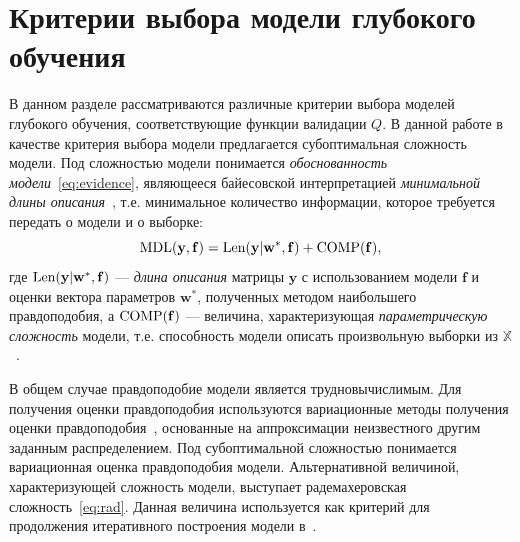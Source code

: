 \section{Критерии выбора модели глубокого обучения}
В данном разделе рассматриваются различные критерии выбора моделей глубокого обучения, соответствующие функции валидации $Q$.
В данной работе в качестве критерия выбора модели предлагается субоптимальная сложность модели. Под сложностью модели понимается \emph{обоснованность модели}~\eqref{eq:evidence}, являющееся байесовской интерпретацией \emph{минимальной длины описания}~\cite{mdl}, т.е. минимальное количество информации, которое требуется передать о модели и о выборке:
\begin{equation}
\label{eq:mdl}
	\textnormal{MDL}(\mathbf{y},\mathbf{f}) = \textnormal{Len}(\mathbf{y}|\mathbf{w}^{*}, \mathbf{f}) + \textnormal{COMP}(\mathbf{f}),
\end{equation}
где  $\textnormal{Len}(\mathbf{y}|\mathbf{w}^{*}, \mathbf{f})$ --- \emph{длина описания} матрицы $\mathbf{y}$ с использованием модели $\mathbf{f}$ и оценки вектора параметров $\mathbf{w}^{*}$, полученных методом наибольшего правдоподобия, а $\textnormal{COMP}(\mathbf{f})$ --- величина, характеризующая \emph{параметрическую сложность} модели, т.е. способность модели описать произвольную выборки из $\mathbb{X}$~\cite{mdl}.

{В общем случае правдоподобие модели является трудновычислимым.} Для получения оценки правдоподобия используются вариационные методы получения оценки правдоподобия~\cite{bishop}, основанные на аппроксимации неизвестного другим заданным распределением. Под субоптимальной сложностью понимается вариационная оценка правдоподобия модели.
Альтернативной величиной, характеризующей сложность модели, выступает радемахеровская сложность~\eqref{eq:rad}. Данная величина используется как критерий для продолжения итеративного построения модели в~\cite{adanet}.

